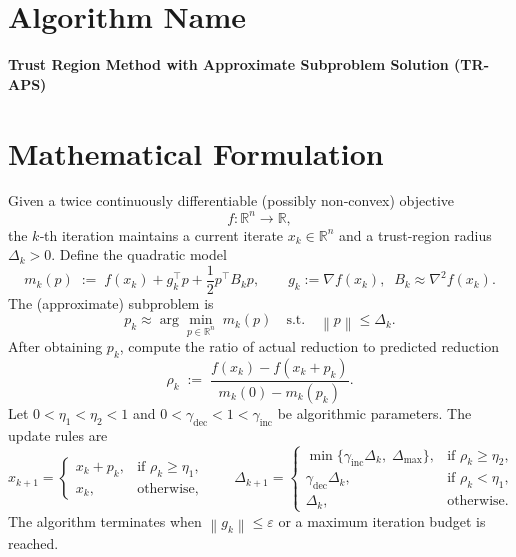 \documentclass{article}
\newcommand{\norm}[1]{\left\lVert#1\right\rVert}
\newcommand{\R}{\mathbb{R}}
\begin{document}
\section*{Algorithm Name}
\textbf{Trust Region Method with Approximate Subproblem Solution (TR-APS)}

\section*{Mathematical Formulation}
Given a twice continuously differentiable (possibly non‑convex) objective 
\[
f:\R^{n}\to\R,
\]
the $k$‑th iteration maintains a current iterate $x_k\in\R^{n}$ and a
trust‑region radius $\Delta_k>0$.  
Define the quadratic model
\[
m_k(p)\;:=\; f(x_k)+g_k^{\top}p+\frac12 p^{\top}B_kp,
\qquad 
g_k:=\nabla f(x_k),\;\; B_k\approx \nabla^{2}f(x_k).
\]
The (approximate) subproblem is
\begin{equation}
\label{eq:subprob}
p_k \approx \arg\min_{p\in\R^{n}}\; m_k(p)\quad\text{s.t.}\quad \norm{p}\le \Delta_k .
\end{equation}
After obtaining $p_k$, compute the ratio of actual reduction to predicted
reduction
\begin{equation}
\label{eq:rho}
\rho_k \;:=\;
\frac{f(x_k)-f(x_k+p_k)}{m_k(0)-m_k(p_k)} .
\end{equation}
Let $0<\eta_1<\eta_2<1$ and $0<\gamma_{\text{dec}}<1<\gamma_{\text{inc}}$ be
algorithmic parameters.  The update rules are
\[
x_{k+1}= 
\begin{cases}
x_k+p_k, & \text{if }\rho_k\ge \eta_1,\\[4pt]
x_k, & \text{otherwise},
\end{cases}
\qquad
\Delta_{k+1}= 
\begin{cases}
\min\{\gamma_{\text{inc}}\Delta_k,\;\Delta_{\max}\}, & \text{if }\rho_k\ge \eta_2,\\[4pt]
\gamma_{\text{dec}}\Delta_k, & \text{if }\rho_k<\eta_1,\\[4pt]
\Delta_k, & \text{otherwise}.
\end{cases}
\]
The algorithm terminates when $\norm{g_k}\le \varepsilon$ or a maximum
iteration budget is reached.
\end{document}
